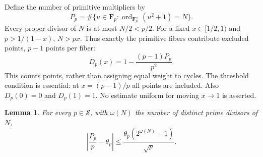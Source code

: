\documentclass[11pt]{article}
\newtheorem{lemma}[theorem]{Lemma}
\theoremstyle{remark}
\newcommand{\Fp}{\mathbf F_p}
\newcommand{\ord}{\operatorname{ord}}
\begin{document}
Define the number of primitive multipliers by
\[
 P_p=\#\{u\in\Fp:\ord_{\Fp^\times}(u^2+1)=N\}.
\]
Every proper divisor of $N$ is at most $N/2<p/2$. For a fixed
$x\in[1/2,1)$ and $p>1/(1-x)$, $N>px$. Thus exactly the primitive
fibers contribute excluded points, $p-1$ points per fiber:
\begin{equation}\label{eq:exact}
 D_p(x)=1-\frac{(p-1)P_p}{p^2}.
\end{equation}
This counts points, rather than assigning equal weight to cycles.
The threshold condition is essential: at $x=(p-1)/p$ all points are
included. Also $D_p(0)=0$ and $D_p(1)=1$. No estimate uniform for moving
$x\to1$ is asserted.

\begin{lemma}\label{lem:primitive}
For every $p\in\mathcal S$, with $\omega(N)$ the number of distinct
prime divisors of $N$,
\begin{equation}\label{eq:primitive}
 \left|\frac{P_p}{p}-\theta_p\right|
 \le\frac{\theta_p(2^{\omega(N)}-1)}{\sqrt p}.
\end{equation}
\end{lemma}
\end{document}
